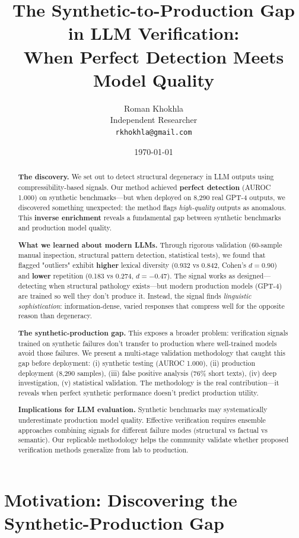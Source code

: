 \documentclass[11pt]{article}
\title{The Synthetic-to-Production Gap in LLM Verification:\\
\textbf{When Perfect Detection Meets Model Quality}}
\author{
  Roman Khokhla\\
  Independent Researcher\\
  \texttt{rkhokhla@gmail.com}
}
\date{\today}
\begin{document}
\maketitle

\begin{abstract}
\textbf{The discovery.} We set out to detect structural degeneracy in LLM outputs using compressibility-based signals. Our method achieved \textbf{perfect detection} (AUROC 1.000) on synthetic benchmarks---but when deployed on 8,290 real GPT-4 outputs, we discovered something unexpected: the method flags \textit{high-quality} outputs as anomalous. This \textbf{inverse enrichment} reveals a fundamental gap between synthetic benchmarks and production model quality.

\textbf{What we learned about modern LLMs.} Through rigorous validation (60-sample manual inspection, structural pattern detection, statistical tests), we found that flagged "outliers" exhibit \textbf{higher} lexical diversity (0.932 vs 0.842, Cohen's $d=0.90$) and \textbf{lower} repetition (0.183 vs 0.274, $d=-0.47$). The signal works as designed---detecting when structural pathology exists---but modern production models (GPT-4) are trained so well they don't produce it. Instead, the signal finds \textit{linguistic sophistication}: information-dense, varied responses that compress well for the opposite reason than degeneracy.

\textbf{The synthetic-production gap.} This exposes a broader problem: verification signals trained on synthetic failures don't transfer to production where well-trained models avoid those failures. We present a multi-stage validation methodology that caught this gap before deployment: (i) synthetic testing (AUROC 1.000), (ii) production deployment (8,290 samples), (iii) false positive analysis (76\% short texts), (iv) deep investigation, (v) statistical validation. The methodology is the real contribution---it reveals when perfect synthetic performance doesn't predict production utility.

\textbf{Implications for LLM evaluation.} Synthetic benchmarks may systematically underestimate production model quality. Effective verification requires ensemble approaches combining signals for different failure modes (structural vs factual vs semantic). Our replicable methodology helps the community validate whether proposed verification methods generalize from lab to production.
\end{abstract}

\section{Motivation: Discovering the Synthetic-Production Gap}
\label{sec:problem}
\end{document}
